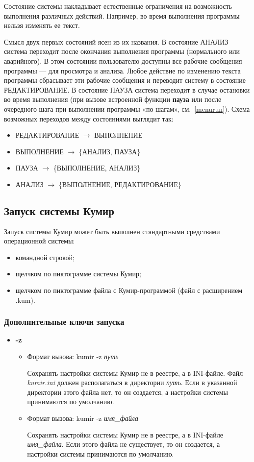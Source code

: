 Состояние системы накладывает естественные ограничения на возможность выполнения различных действий. Например, во время выполнения программы нельзя изменять ее текст. 

Смысл двух первых состояний ясен из их названия.  В состояние АНАЛИЗ  система переходит после окончания выполнения программы (нормального или аварийного). В этом состоянии пользователю доступны все рабочие сообщения программы --- для просмотра и анализа. Любое действие по изменению текста программы сбрасывает эти рабочие сообщения и переводит систему в состояние РЕДАКТИРОВАНИЕ. В состояние ПАУЗА система переходит в случае остановки во время выполнения (при вызове встроенной функции \textsf{\textbf{\mbox{пауза}}} или после очередного шага при выполнении программы «по шагам», см.~\ref{menurun}). Схема возможных переходов между состояниями выглядит так:
\begin{itemize}
\item РЕДАКТИРОВАНИЕ $\to$ ВЫПОЛНЕНИЕ
\item ВЫПОЛНЕНИЕ  $\to$ \{АНАЛИЗ, ПАУЗА\}
\item ПАУЗА $\to$ \{ВЫПОЛНЕНИЕ,  АНАЛИЗ\}
\item АНАЛИЗ  $\to$ \{ВЫПОЛНЕНИЕ,  РЕДАКТИРОВАНИЕ\}
\end{itemize}

\subsection{Запуск системы Кумир}

Запуск системы Кумир может быть выполнен стандартными средствами операционной системы:
\begin{itemize}
\item командной строкой;
\item щелчком по пиктограмме системы Кумир;
\item щелчком по пиктограмме файла с Кумир-программой (файл с расширением .kum).
\end{itemize}

\subsubsection{Дополнительные ключи запуска}
\begin{itemize}
\item \textbf{-z}
\begin{itemize}
\item Формат вызова: \textsf{kumir -z \textit{путь}}

Сохранять настройки системы Кумир не в реестре, а в INI-файле. Файл \textit{kumir.ini} должен располагаться в директории \textit{путь}. Если в указанной директории этого файла нет, то он создается, а настройки системы принимаются по умолчанию.

\item Формат вызова: \textsf{kumir -z \textit{имя\_файла}}

Сохранять настройки системы Кумир не в реестре, а в INI-файле \textit{имя\_файла}. Если этого файла не существует, то он создается, а настройки системы принимаются по умолчанию.
\end{itemize}
\end{itemize}


